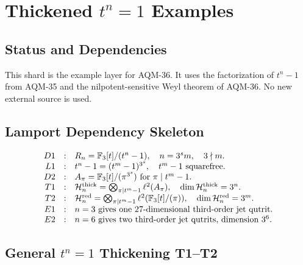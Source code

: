 
\section{Thickened \texorpdfstring{\(t^n=1\)}{t to the n equals 1} Examples}
\label{sec:thickened-tn-equals-1-examples}

\subsection{Status and Dependencies}

This shard is the example layer for AQM-36.  It uses the factorization of
\(t^n-1\) from AQM-35 and the nilpotent-sensitive Weyl theorem of AQM-36.  No
new external source is used.

\subsection{Lamport Dependency Skeleton}

\[
\begin{array}{rcl}
D1&:&R_n=\mathbb F_3[t]/(t^n-1),\quad n=3^s m,\quad 3\nmid m.\\
L1&:&t^n-1=(t^m-1)^{3^s},\quad t^m-1\text{ squarefree}.\\
D2&:&A_\pi=\mathbb F_3[t]/(\pi^{3^s})\text{ for }\pi\mid t^m-1.\\
T1&:&\mathcal H_n^{\rm thick}=\bigotimes_{\pi\mid t^m-1}\ell^2(A_\pi),
      \quad \dim\mathcal H_n^{\rm thick}=3^n.\\
T2&:&\mathcal H_n^{\rm red}=\bigotimes_{\pi\mid t^m-1}
      \ell^2(\mathbb F_3[t]/(\pi)),\quad
      \dim\mathcal H_n^{\rm red}=3^m.\\
E1&:&n=3\text{ gives one }27\text{-dimensional third-order jet qutrit}.\\
E2&:&n=6\text{ gives two third-order jet qutrits, dimension }3^6.
\end{array}
\]

\subsection{General \texorpdfstring{\(t^n=1\)}{t to the n equals 1} Thickening T1--T2}

